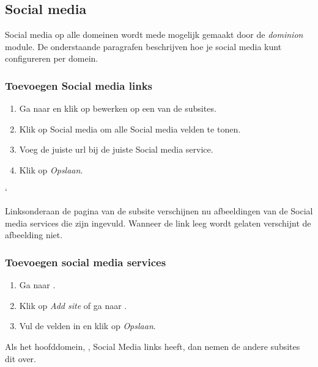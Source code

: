 \subsection{Social media}\label{socialmedia}
Social media op alle domeinen wordt mede mogelijk gemaakt door de \emph{dominion} module. 
De onderstaande paragrafen beschrijven hoe je social media kunt configureren per domein. 

\subsubsection{Toevoegen Social media links}

\begin{enumerate}
\item Ga naar   en klik op bewerken op een van de subsites.
\item Klik op Social media om alle Social media velden te tonen.
\item Voeg de juiste url bij de juiste Social media service.
\item Klik op \emph{Opslaan}.
\end{enumerate}`

Linksonderaan de pagina van de subsite verschijnen nu afbeeldingen van de Social media services die zijn ingevuld. Wanneer de link leeg wordt gelaten verschijnt de afbeelding niet.

\subsubsection{Toevoegen social media services}

\begin{enumerate}
\item Ga naar  .
\item Klik op \emph{Add site} of ga naar .
\item Vul de velden in en klik op \emph{Opslaan}.
\end{enumerate}

Als het hoofddomein, \drupalpath, Social Media links heeft, dan nemen de andere subsites dit over.